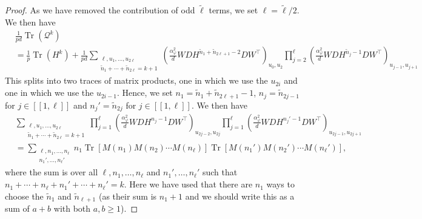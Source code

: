 \documentclass[letterpaper, 10pt, dvipsnames]{article}
\numberwithin{equation}{section}
\DeclareMathOperator{\Tr}{Tr}
\newcommand{\Q}{\mathcal{Q}}
\renewcommand{\phi}{\varphi}
\renewcommand{\tilde}{\widetilde}
\newcommand{\unn}[2]{[\![#1,#2]\!]}
\theoremstyle{definition}
\begin{document}
\begin{proof}
  As we have removed the contribution of odd $\tilde{\ell}$ terms, we set $\ell = \tilde{\ell}/2$. We then have 
  \[
  \begin{aligned}
    &\frac{1}{pd}\Tr(\Q^k) 
    \\&=
    \frac{1}{p}\Tr(H^k)+
    \frac{1}{pd}
    \sum_{\substack{\ell, u_1, \dots, u_{2\ell} \\ \tilde{n}_1+\cdots+\tilde{n}_{2\ell}=k+1}}
    \left(     
      \frac{\alpha_\phi^2}{d}  
      W D H^{\tilde{n}_1+\tilde{n}_{2\ell+1}-2} DW^\top 
    \right)_{u_0, u_2}
    \prod_{j=2}^{\ell}
    \left( 
      \frac{\alpha_\phi^2}{d}
      W D H^{\tilde{n}_j-1} DW^\top 
    \right)_{u_{j-1}, u_{j+1}}
  \end{aligned}
  \] 
  This splits into two traces of matrix products, one in which we use the $u_{2i}$ and one in which we use the $u_{2i-1}$.  Hence, we set $n_1 = \tilde{n}_1+\tilde{n}_{2\ell+1}-1$, $n_j = \tilde{n}_{2j-1}$ for $j \in \unn{1}{\ell}$ and $n_j' = \tilde{n}_{2j}$ for $j \in \unn{1}{\ell}$.  We then have 
  \[
  \begin{aligned}
    &\sum_{\substack{\ell, u_1, \dots, u_{2\ell} \\ \tilde{n}_1+\cdots+\tilde{n}_{2\ell}=k+1}}
    \prod_{j=1}^{\ell}
    \left( 
      \frac{\alpha_\phi^2}{d}
      W D H^{{n}_j-1} DW^\top 
    \right)_{u_{2j-2}, u_{2j}}
    \prod_{j=1}^{\ell}
    \left( 
      \frac{\alpha_\phi^2}{d}
      W D H^{n_j'-1} DW^\top 
    \right)_{u_{2j-1}, u_{2j+1}} \\ 
    &=
    \sum_{\substack{\ell, n_1, \dots, n_{\ell} \\ n_1', \dots, n_{\ell}'}}
    n_1 \Tr[ M(n_1)M(n_2)\cdots M(n_\ell)]\Tr[M(n_1')M(n_2')\cdots M(n_\ell')],
  \end{aligned}
  \]
  where the sum is over all $\ell, n_1, \dots, n_{\ell}$ and $n_1', \dots, n_{\ell}'$ such that $n_1+\cdots+n_{\ell} + n_1'+\cdots+n_{\ell}'=k$.
  Here we have used that there are $n_1$ ways to choose the $\tilde{n}_1$ and $\tilde{n}_{\ell+1}$ (as their sum is $n_1+1$ and we should write this as a sum of $a+b$ with both $a,b\geq 1$).
\end{proof}
\end{document}
